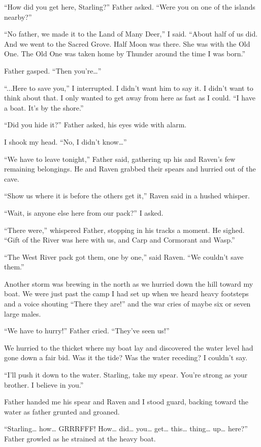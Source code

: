 ``How did you get here, Starling?'' Father asked. ``Were you on one of the islands nearby?''

``No father, we made it to the Land of Many Deer,'' I said. ``About half of us did. And we went to the Sacred Grove. Half Moon was there. She was with the Old One. The Old One was taken home by Thunder around the time I was born.''

Father gasped. ``Then you're\ldots''

``...Here to save you,'' I interrupted. I didn't want him to say it. I didn't want to think about that. I only wanted to get away from here as fast as I could. ``I have a boat. It's by the shore.''

``Did you hide it?'' Father asked, his eyes wide with alarm.

I shook my head. ``No, I didn't know\ldots''

``We have to leave tonight,'' Father said, gathering up his and Raven's few remaining belongings. He and Raven grabbed their spears and hurried out of the cave.

``Show us where it is before the others get it,'' Raven said in a hushed whisper.

``Wait, is anyone else here from our pack?'' I asked.

``There were,'' whispered Father, stopping in his tracks a moment. He sighed. ``Gift of the River was here with us, and Carp and Cormorant and Wasp.''

``The West River pack got them, one by one,'' said Raven. ``We couldn't save them.''

Another storm was brewing in the north as we hurried down the hill toward my boat. We were just past the camp I had set up when we heard heavy footsteps and a voice shouting ``There they are!'' and the war cries of maybe six or seven large males.

``We have to hurry!'' Father cried. ``They've seen us!''

We hurried to the thicket where my boat lay and discovered the water level had gone down a fair bid. Was it the tide? Was the water receding? I couldn't say.

``I'll push it down to the water. Starling, take my spear. You're strong as your brother. I believe in you.''

Father handed me his spear and Raven and I stood guard, backing toward the water as father grunted and groaned.

``Starling\ldots{} how\ldots{} GRRRFFF! How\ldots{} did\ldots{} you\ldots{} get\ldots{} this\ldots{} thing\ldots{} up\ldots{} here?'' Father growled as he strained at the heavy boat.

